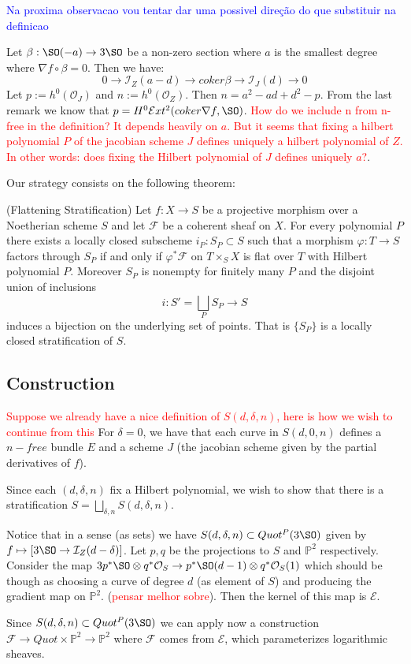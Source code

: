 \textcolor{blue}{Na proxima observacao vou tentar dar uma possivel direção do que substituir na definicao}

\begin{remark}
Let $\beta: \SO(-a) \to 3 \SO$ be a non-zero section where $a$ is the smallest degree where $\nabla f \circ \beta = 0$. Then we have:
\begin{equation}
    0 \to \mathcal{I}_Z(a-d) \to coker \beta \to \mathcal{I}_J(d) \to 0
\end{equation}
Let $p := h^0(\mathcal{O}_J)$ and $n := h^0(\mathcal{O}_Z)$. Then $n = a^2-ad+d^2-p$. From the last remark we know that $p=H^0 \mathcal{E}xt^2(coker \nabla f,\SO)$. \textcolor{red}{How do we include n from n-free in the definition? It depends heavily on $a$. But it seems that fixing a hilbert polynomial $P$ of the jacobian scheme $J$ defines uniquely a hilbert polynomial of $Z$. In other words: does fixing the Hilbert polynomial of $J$ defines uniquely $a$?}.
\end{remark}

Our strategy consists on the following theorem:
\begin{theorem}(Flattening Stratification)
Let $f: X \to S$ be a projective morphism over a Noetherian scheme $S$ and let $\mathcal{F}$ be a coherent sheaf on $X$. For every polynomial $P$ there exists a locally closed subscheme $i_P : S_P \subset S$ such that a morphism $\varphi : T \to S$ factors through $S_P$ if and only if $\varphi ^* \mathcal{F}$ on $T \times_S X$ is flat over $T$ with Hilbert polynomial $P$. Moreover $S_P$ is nonempty for finitely many $P$ and the disjoint union of inclusions
$$i : S' = \bigsqcup_P S_P \to S $$ induces a bijection on the underlying set of points. That is $\{S_P \}$ is a locally closed stratification of $S$.
\end{theorem}

\subsection{Construction}
\textcolor{red}{Suppose we already have a nice definition of $S(d,\delta,n)$, here is how we wish to continue from this}
For $\delta = 0$, we have that each curve in $S(d,0,n)$ defines a $n-free$ bundle $E$ and a scheme $J$ (the jacobian scheme given by the partial derivatives of $f$). 

Since each $(d,\delta,n)$ fix a Hilbert polynomial, we wish to show that there is a stratification $S=\bigsqcup_{\delta,n} S(d,\delta,n)$.


Notice that in a sense (as sets) we have $S(d,\delta,n) \subset Quot^P(3\SO)$ given by $f \mapsto [3\SO \to \mathcal{I}_Z(d-\delta)]$. Let $p,q$ be the projections to $S$ and $\mathbb{P}^2$ respectively. Consider the map $3p^*\SO \otimes q^* \mathcal{O}_S \to p^* \SO(d-1) \otimes q^* \mathcal{O}_S(1)$ which should be though as choosing a curve of degree $d$ (as element of $S$) and producing the gradient map on $\mathbb{P}^2$. (\textcolor{red}{pensar melhor sobre}). Then the kernel of this map is $\mathcal{E}$.

Since $S(d,\delta,n) \subset Quot^P(3\SO)$ we can apply now a construction $\mathcal{F}\to Quot \times \mathbb{P}^2 \to \mathbb{P}^2$ where $\mathcal{F}$ comes from $\mathcal{E}$, which parameterizes logarithmic sheaves.